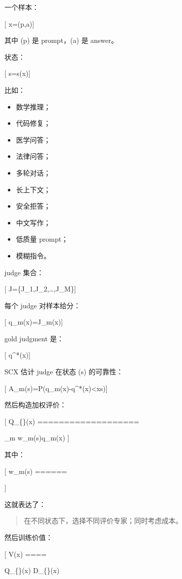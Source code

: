 \documentclass[
  12pt,
]{ctexart}
\providecommand{\tightlist}{%
  \setlength{\itemsep}{0pt}\setlength{\parskip}{0pt}}
\begin{document}
一个样本：

{[} x=(p,a){]}

其中 (p) 是 prompt，(a) 是 answer。

状态：

{[} s=s(x){]}

比如：

\begin{itemize}
\tightlist
\item
  数学推理；
\item
  代码修复；
\item
  医学问答；
\item
  法律问答；
\item
  多轮对话；
\item
  长上下文；
\item
  安全拒答；
\item
  中文写作；
\item
  低质量 prompt；
\item
  模糊指令。
\end{itemize}

judge 集合：

{[} \mathcal J=\{J\_1,J\_2,\dots,J\_M\}{]}

每个 judge 对样本给分：

{[} q\_m(x)=J\_m(x){]}

gold judgment 是：

{[} q\^{}*(x){]}

SCX 估计 judge 在状态 (s) 的可靠性：

{[}
A\_m(s)=P(\textbar q\_m(x)-q\^{}*(x)\textbar\textless{}\tau\mid x\in s){]}

然后构造加权评价：

{[} Q\_\{\}(x) ===================

\sum\_m w\_m(s)q\_m(x) {]}

其中：

{[} w\_m(s) ======


{]}

这就表达了：

\begin{quote}
在不同状态下，选择不同评价专家；同时考虑成本。
\end{quote}

然后训练价值：

{[} V(x) ====

Q\_\{\}(x) \cdot D\_\{\}(x) \cdot
[1-N_{\mathrm{noise}}(x)]{]}
\end{document}

